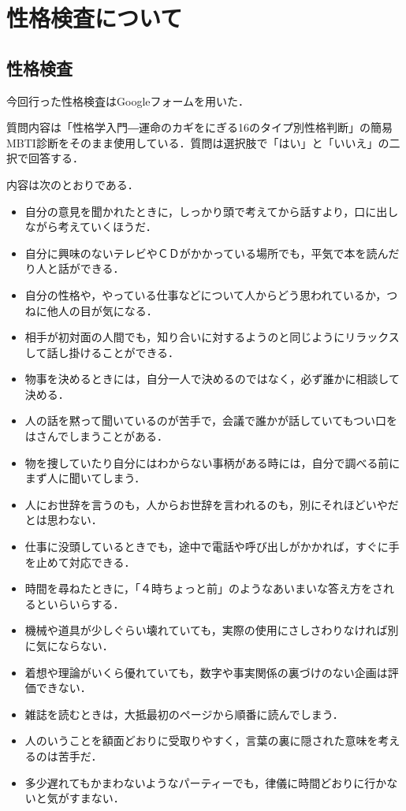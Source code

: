 \section{性格検査について}
\subsection{性格検査}
今回行った性格検査はGoogleフォームを用いた．

質問内容は「性格学入門―運命のカギをにぎる16のタイプ別性格判断」の簡易MBTI診断をそのまま使用している\cite{MBTI}．質問は選択肢で「はい」と「いいえ」の二択で回答する．

内容は次のとおりである．
\begin{itemize}
\item 自分の意見を聞かれたときに，しっかり頭で考えてから話すより，口に出しながら考えていくほうだ．
\item 自分に興味のないテレビやＣＤがかかっている場所でも，平気で本を読んだり人と話ができる．
\item 自分の性格や，やっている仕事などについて人からどう思われているか，つねに他人の目が気になる．
\item 相手が初対面の人間でも，知り合いに対するようのと同じようにリラックスして話し掛けることができる．
\item 物事を決めるときには，自分一人で決めるのではなく，必ず誰かに相談して決める．
\item 人の話を黙って聞いているのが苦手で，会議で誰かが話していてもつい口をはさんでしまうことがある．
\item 物を捜していたり自分にはわからない事柄がある時には，自分で調べる前にまず人に聞いてしまう．
\item 人にお世辞を言うのも，人からお世辞を言われるのも，別にそれほどいやだとは思わない．
\item 仕事に没頭しているときでも，途中で電話や呼び出しがかかれば，すぐに手を止めて対応できる．
\item 時間を尋ねたときに，「４時ちょっと前」のようなあいまいな答え方をされるといらいらする．
\item 機械や道具が少しぐらい壊れていても，実際の使用にさしさわりなければ別に気にならない．
\item 着想や理論がいくら優れていても，数字や事実関係の裏づけのない企画は評価できない．
\item 雑誌を読むときは，大抵最初のページから順番に読んでしまう．
\item 人のいうことを額面どおりに受取りやすく，言葉の裏に隠された意味を考えるのは苦手だ．
\item 多少遅れてもかまわないようなパーティーでも，律儀に時間どおりに行かないと気がすまない．

\end{itemize}
